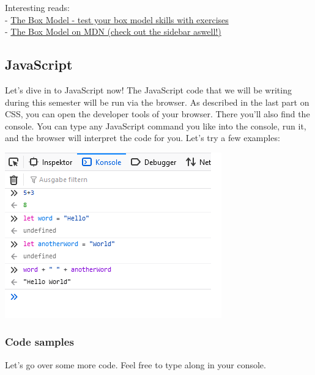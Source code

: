 \documentclass[
]{article}
\begin{document}
Interesting reads:\\
- \href{https://www.w3schools.com/css/css_boxmodel.asp}{The Box Model - test your box model skills with exercises}\\
- \href{https://developer.mozilla.org/en-US/docs/Learn/CSS/Building_blocks/The_box_model}{The Box Model on MDN (check out the sidebar aswell!)}

\hypertarget{javascript}{%
\subsection{JavaScript}\label{javascript}}

Let's dive in to JavaScript now! The JavaScript code that we will be writing during this semester will be run via the browser. As described in the last part on CSS, you can open the developer tools of your browser. There you'll also find the console. You can type any JavaScript command you like into the console, run it, and the browser will interpret the code for you. Let's try a few examples:

\includegraphics{docs/assets/console.png}

\hypertarget{code-samples}{%
\subsubsection*{Code samples}\label{code-samples}}

Let's go over some more code. Feel free to type along in your console.
\end{document}
